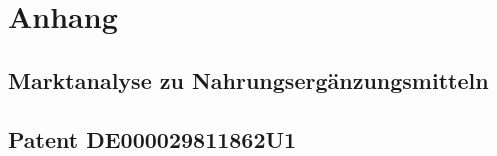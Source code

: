 \chapter{Anhang}
\label{Anhang}
\section{Marktanalyse zu Nahrungsergänzungsmitteln}


\section{Patent DE000029811862U1}
